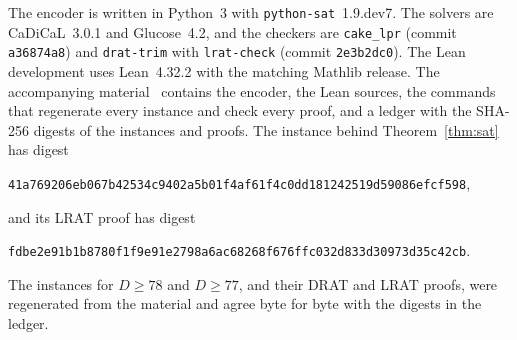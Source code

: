 \documentclass[11pt]{amsart}
\theoremstyle{remark}
\begin{document}
The encoder is written in Python~3 with \texttt{python-sat}~1.9.dev7. The
solvers are CaDiCaL~3.0.1 and Glucose~4.2, and the checkers are
\texttt{cake\_lpr} (commit \texttt{a36874a8}) and \texttt{drat-trim} with
\texttt{lrat-check} (commit \texttt{2e3b2dc0}). The Lean development uses
Lean~4.32.2 with the matching Mathlib release. The accompanying
material~\cite{Artifact} contains the encoder, the Lean sources, the commands
that regenerate every instance and check every proof, and a ledger with the
SHA-256 digests of the instances and proofs. The instance behind
Theorem~\ref{thm:sat} has digest
\begin{center}
\texttt{41a769206eb067b42534c9402a5b01f4af61f4c0dd181242519d59086efcf598},
\end{center}
and its LRAT proof has digest
\begin{center}
\texttt{fdbe2e91b1b8780f1f9e91e2798a6ac68268f676ffc032d833d30973d35c42cb}.
\end{center}
The instances for $D\ge78$ and $D\ge77$, and their DRAT and LRAT proofs, were
regenerated from the material and agree byte for byte with the digests in the
ledger.
\end{document}

